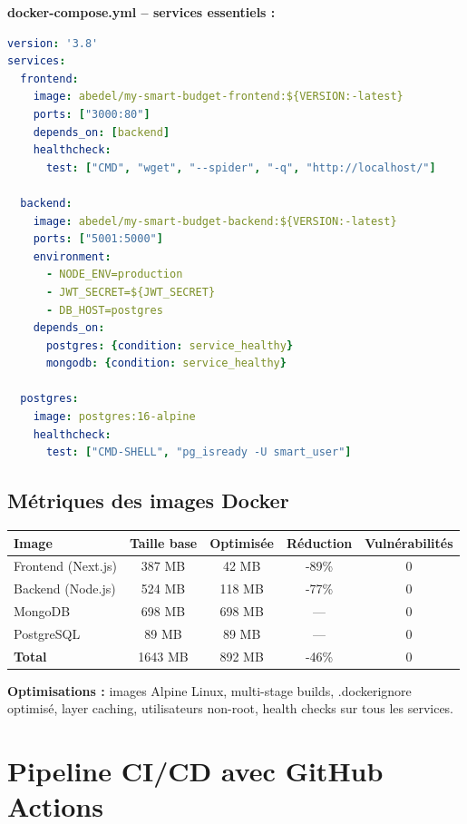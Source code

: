 \begin{exemple}
\textbf{docker-compose.yml -- services essentiels :}
\begin{lstlisting}[language=yaml]
version: '3.8'
services:
  frontend:
    image: abedel/my-smart-budget-frontend:${VERSION:-latest}
    ports: ["3000:80"]
    depends_on: [backend]
    healthcheck:
      test: ["CMD", "wget", "--spider", "-q", "http://localhost/"]

  backend:
    image: abedel/my-smart-budget-backend:${VERSION:-latest}
    ports: ["5001:5000"]
    environment:
      - NODE_ENV=production
      - JWT_SECRET=${JWT_SECRET}
      - DB_HOST=postgres
    depends_on:
      postgres: {condition: service_healthy}
      mongodb: {condition: service_healthy}

  postgres:
    image: postgres:16-alpine
    healthcheck:
      test: ["CMD-SHELL", "pg_isready -U smart_user"]
\end{lstlisting}
\end{exemple}

\subsection{Métriques des images Docker}

\begin{tcolorbox}[colback=green!5!white,colframe=green!60!black,title=\textbf{Métriques des images Docker (Décembre 2025)}]
\begin{center}
\begin{tabular}{|l|c|c|c|c|}
\hline
\textbf{Image} & \textbf{Taille base} & \textbf{Optimisée} & \textbf{Réduction} & \textbf{Vulnérabilités} \\
\hline
Frontend (Next.js) & 387 MB & 42 MB & -89\% & 0 \\
Backend (Node.js) & 524 MB & 118 MB & -77\% & 0 \\
MongoDB & 698 MB & 698 MB & --- & 0 \\
PostgreSQL & 89 MB & 89 MB & --- & 0 \\
\hline
\textbf{Total} & 1643 MB & 892 MB & -46\% & 0 \\
\hline
\end{tabular}
\end{center}
\textbf{Optimisations :} images Alpine Linux, multi-stage builds, .dockerignore optimisé, layer caching, utilisateurs non-root, health checks sur tous les services.
\end{tcolorbox}

\section{Pipeline CI/CD avec GitHub Actions}


